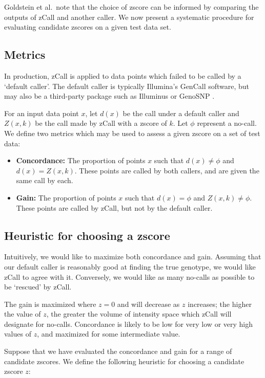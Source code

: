\documentclass{article}
\begin{document}
Goldstein et al.\ note that the choice of zscore can be informed by comparing the outputs of zCall and another caller. We now present a systematic procedure for evaluating candidate zscores on a given test data set.

\subsection{Metrics}

In production, zCall is applied to data points which failed to be called by a `default caller'. The default caller is typically Illumina's GenCall software, but may also be a third-party package such as Illuminus or GenoSNP \cite{genosnp, illuminus}.

For an input data point $x$, let $d(x)$ be the call under a default caller and  $Z(x,k)$ be the call made by zCall with a zscore of $k$. Let $\phi$ represent a no-call. We define two metrics which may be used to assess a given zscore on a set of test data:
\begin{itemize}
\item \textbf{Concordance:} The proportion of points $x$ such that $d(x) \neq \phi$ and $d(x) = Z(x,k)$. These points are called by both callers, and are given the same call by each.
\item \textbf{Gain:} The proportion of points $x$ such that $d(x) = \phi$ and $Z(x,k) \neq \phi$. These points are called by zCall, but not by the default caller.
\end{itemize}

\subsection{Heuristic for choosing a zscore}

Intuitively, we would like to maximize both concordance and gain.  Assuming that our default caller is reasonably good at finding the true genotype, we would like zCall to agree with it. Conversely, we would like as many no-calls as possible to be `rescued' by zCall.

The gain is maximized where $z=0$ and will decrease as $z$ increases; the higher the value of $z$, the greater the volume of intensity space which zCall will designate for no-calls. Concordance is likely to be low for very low or very high values of $z$, and maximized for some intermediate value. 

Suppose that we have evaluated the concordance and gain for a range of candidate zscores. We define the following heuristic for choosing a candidate zscore $z$:
\end{document}
